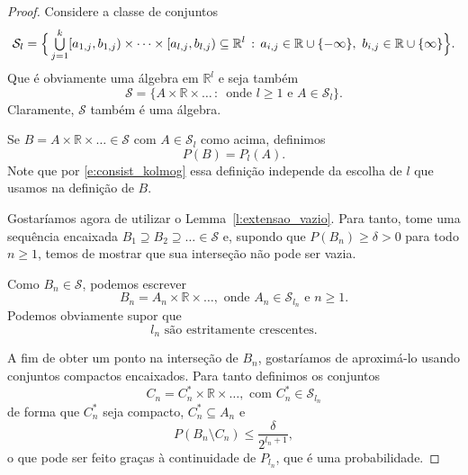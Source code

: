 \begin{proof}
  Considere a classe de conjuntos
  \begin{equation*}
    \mathcal{S}_l = \Big\{ \operatorname*{{\textstyle \bigcup}}_{j=1}^k [a_{1,j}, b_{1,j}) \times \dots \times [a_{l,j}, b_{l,j}) \subseteq \mathbb{R}^l \, : \,
    a_{i,j} \in \mathbb{R} \cup \{-\infty\},\ b_{i,j} \in \mathbb{R} \cup \{\infty\} \Big\}.
  \end{equation*}
  Que é obviamente uma álgebra em $\mathbb{R}^l$ e seja também
  \begin{equation}
    \mathcal{S} = \big\{ A \times \mathbb{R} \times \dots\, : \, \text{ onde } l \geq 1 \text{ e } A \in \mathcal{S}_l \big\}.
  \end{equation}
  Claramente, $\mathcal{S}$ também é uma álgebra.

  Se $B = A \times \mathbb{R} \times \dots \in \mathcal{S}$ com $A \in \mathcal{S}_l$ como acima, definimos
  \begin{equation}
    P(B) = P_l(A).
  \end{equation}
  Note que por \eqref{e:consist_kolmog} essa definição independe da escolha de $l$ que usamos na definição de $B$.

  Gostaríamos agora de utilizar o Lemma~\ref{l:extensao_vazio}.
  Para tanto, tome uma sequência encaixada $B_1 \supseteq B_2 \supseteq \dots \in \mathcal{S}$ e, supondo que $P(B_n) \geq \delta > 0$ para todo $n \geq 1$, temos de mostrar que sua interseção não pode ser vazia.

  Como $B_n \in \mathcal{S}$, podemos escrever
  \begin{equation}
    B_n = A_n \times \mathbb{R} \times \dots, \text{ onde $A_n \in \mathcal{S}_{l_n}$ e $n \geq 1$.}
  \end{equation}
  Podemos obviamente supor que
  \begin{equation}
    \label{e:l_n_monotona}
    \text{$l_n$ são estritamente crescentes.}
  \end{equation}

  A fim de obter um ponto na interseção de $B_n$, gostaríamos de aproximá-lo usando conjuntos compactos encaixados.
  Para tanto definimos os conjuntos
  \begin{equation}
    C_n = C_n^* \times \mathbb{R} \times \dots, \text{ com $C_n^* \in \mathcal{S}_{l_n}$}
  \end{equation}
  de forma que $C_n^*$ seja compacto, $C_n^* \subseteq A_n$ e
  \begin{equation}
    P(B_n \setminus C_n) \leq \frac{\delta}{2^{l_n + 1}},
  \end{equation}
  o que pode ser feito graças à continuidade de $P_{l_n}$, que é uma probabilidade.


\end{proof}
